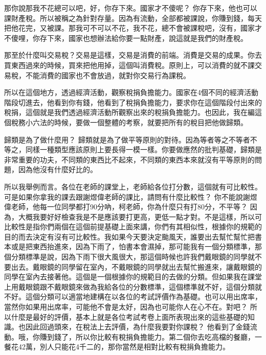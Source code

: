 \documentclass[]{ctexbook}
\begin{document}
那你說那我不花總可以吧，好，你存下來。國家才不傻呢？ 你存下來，他也可以課財產稅。所以被稱之為針對存量。因為有流動，全部都被課說，你賺到錢，每天把他花完，又被課。那我可不可以不花，我不花，總不會被課稅吧，沒有，國家才不傻哩，你存下來，國家也想辦法給你要一點財產，說這就是我們的財產稅。

那至於什麼叫交易稅？交易是這樣，交易是消費的前端。消費是交易的成果。你去買東西過來的時候，買來把他用掉，這個叫消費稅。原則上，可以消費的就不課交易稅，不能消費的國家也不會放過，就對你交易行為課稅。

所以在這個地方，透過經濟活動，觀察稅捐負擔能力。國家在4個不同的經濟活動階段切進去，他看到你有錢，他看到了稅捐負擔能力，要求你在這個階段付出來的稅捐，這個就是我們透過經濟活動所觀察出來的稅捐負擔能力。也因此，我在編這個稅務小六法的時候，要做一個整體的考察，就要把所有的稅目把他做歸類。

歸類是為了做什麼用？ 歸類就是為了做平等原則的對待。因為等者等之不等者不等之，同樣一種類型應該原則上要長得一模一樣。你要做應然的批判基礎，歸類是非常重要的功夫，不同類的東西比不起來，不同類的東西本來就沒有平等原則的問題，因為他沒有什麼好比的。

所以我舉例而言。各位在老師的課堂上，老師給各位打分數，這個就有可比較性。可是如果你拿我的課去跟謝煜偉老師的課比，請問有什麼比較性？ 你不能說謝煜偉老師，他每一位同學都打90分吶，柯老師，你為什麼只有打80分，不平等？ 因為，大概我要好好檢查我是不是應該要打更高，更低一點才對。不是這樣，所以可比較性是指你們兩個在這個前提基礎上面來講，你們有其相似性，根據你的規範的目的而去決定有沒有可比較性。我如果今天要決定颱風天，誰要出去幫忙幫忙把書本或是把東西抬進來，因為下雨了，怕書本會濕掉，那可能我有一個分類標準，那個分類標準是說，因為下雨下很大風很大，那這個時候也許我們戴眼鏡的同學就不要出去。戴眼鏡的同學留在室內，不戴眼鏡的同學就出去幫忙搬進來，讓戴眼鏡的同學在室內去接著他。這個是一個根據你的規範目的去做的分類。但如果我在課堂上用戴眼鏡跟不戴眼鏡來做為我給各位的分數標準，這個標準就不好，這個分類就不好。這個分類可以適當地建構在以各位的考試評價作為基礎。也可以用出席率，當然你如果用出席率，可能他不會是太好，因為也可能你人在心不在。對吧？ 所以什麼是最好的評價，基本上就是各位考試考卷上面所表現出來的這些基礎的知識。也因此回過頭來，在稅法上去評價，為什麼我要對你課稅？ 他看到了金錢流動。哦，你賺到錢了，所以你比較有稅捐負擔能力。第二個你去吃高檔的餐廳，一餐花42萬，別人只能花4千二的，那你當然是相對比較有稅捐負擔能力。
\end{document}
